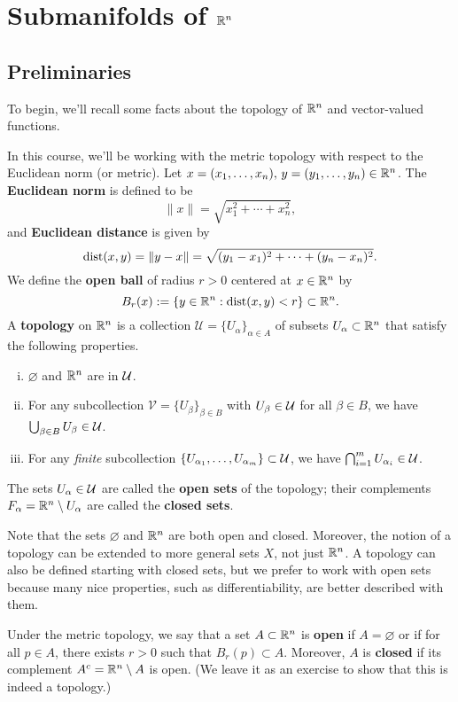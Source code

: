 \section{Submanifolds of $\mathbb{R}^n$}\label{sec:1}

\subsection{Preliminaries}\label{subsec:1.1}
To begin, we'll recall some facts about the topology of $\mathbb{R}^n$ and 
vector-valued functions.

In this course, we'll be working with the metric topology with respect 
to the Euclidean norm (or metric). Let $x = (x_1, \dots, x_n),\,
y = (y_1, \dots, y_n) \in \mathbb{R}^n$.
The {\bf Euclidean norm} is defined to be 
\[ \|x\| = \sqrt{x_1^2 + \cdots + x_n^2}, \] 
and {\bf Euclidean distance} is given by 
\[ \operatorname{dist}(x, y) = \|y - x\| = \sqrt{(y_1 - x_1)^2 + 
\cdots + (y_n - x_n)^2}. \] 
We define the {\bf open ball} of radius $r > 0$ centered at $x \in \mathbb{R}^n$ by 
\[ B_r(x) := \{y \in \mathbb{R}^n : \operatorname{dist}(x, y) < r\} \subset \mathbb{R}^n. \] 
A {\bf topology} on $\mathbb{R}^n$ is a collection $\mathcal{U} = \{U_\alpha\}_{\alpha \in A}$ 
of subsets $U_\alpha \subset \mathbb{R}^n$ that satisfy the following properties.
\begin{enumerate}[(i)]
    \item $\varnothing$ and $\mathbb{R}^n$ are in ${\cal U}$. 
    \item For any subcollection $\mathcal{V} = \{U_\beta\}_{\beta \in B}$ 
    with $U_\beta \in {\cal U}$ for all $\beta \in B$, we have 
    $\bigcup_{\beta \in B} U_\beta \in {\cal U}$. 
    \item For any \emph{finite} subcollection $\{U_{\alpha_1}, \dots, 
    U_{\alpha_m}\} \subset {\cal U}$, we have $\bigcap_{i=1}^m 
    U_{\alpha_i} \in {\cal U}$. 
\end{enumerate}
The sets $U_\alpha \in {\cal U}$ are called the {\bf open sets} of the topology; 
their complements $F_\alpha = \mathbb{R}^n \setminus U_\alpha$ are called the 
{\bf closed sets}. 

Note that the sets $\varnothing$ and $\mathbb{R}^n$ are both open and closed. 
Moreover, the notion of a topology can be extended to more general sets 
$X$, not just $\mathbb{R}^n$. A topology can also be defined starting with closed sets,
but we prefer to work with open sets because many nice properties, such as 
differentiability, are better described with them.

Under the metric topology, we say that a set $A \subset \mathbb{R}^n$ is {\bf open} 
if $A = \varnothing$ or if for all $p \in A$, there exists $r > 0$ 
such that $B_r(p) \subset A$. Moreover, $A$ is {\bf closed} if its 
complement $A^c = \mathbb{R}^n \setminus A$ is open. (We leave it as an 
exercise to show that this is indeed a topology.) 

